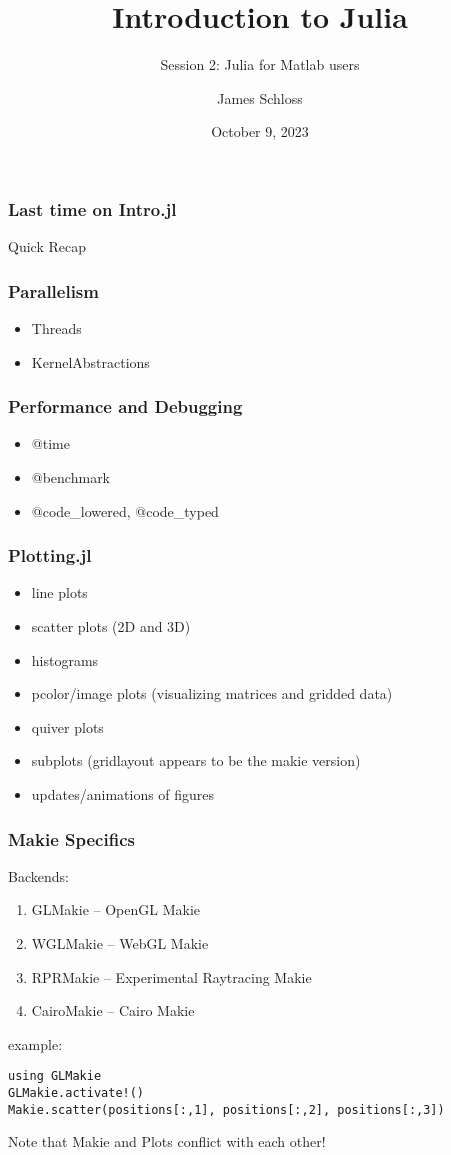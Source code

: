 \documentclass{beamer}
\title[Intro.jl]{Introduction to Julia} %
\subtitle{Session 2: Julia for Matlab users}
\author{James Schloss} %
\institute[LeiosLabs] %
{
\textit{jrs.schloss@gmail.com} %
}
\date{October 9, 2023} %
\begin{document}
\begin{frame}
\vspace*{1.4cm}
\titlepage %
\end{frame}


\begin{frame}
\frametitle{Last time on Intro.jl}
\center \Huge{Quick Recap}
\end{frame}

\begin{frame}
\frametitle{Parallelism}
\begin{itemize}
\item Threads
\item KernelAbstractions
\end{itemize}
\end{frame}

\begin{frame}
\frametitle{Performance and Debugging}
\begin{itemize}
\item @time
\item @benchmark
\item @code\_lowered, @code\_typed
\end{itemize}
\end{frame}

\begin{frame}
\frametitle{Plotting.jl}

\begin{itemize}
\item line plots
\item scatter plots (2D and 3D)
\item histograms
\item pcolor/image plots (visualizing matrices and gridded data)
\item quiver plots
\item subplots (gridlayout appears to be the makie version)
\item updates/animations of figures
\end{itemize}
\end{frame}

\begin{frame}[fragile]
\frametitle{Makie Specifics}

Backends:
\begin{enumerate}
\item GLMakie -- OpenGL Makie
\item WGLMakie -- WebGL Makie
\item RPRMakie -- Experimental Raytracing Makie
\item CairoMakie -- Cairo Makie
\end{enumerate}

example:
\begin{lstlisting}
using GLMakie
GLMakie.activate!()
Makie.scatter(positions[:,1], positions[:,2], positions[:,3])
\end{lstlisting}

Note that Makie and Plots conflict with each other!
\end{frame}
\end{document}
